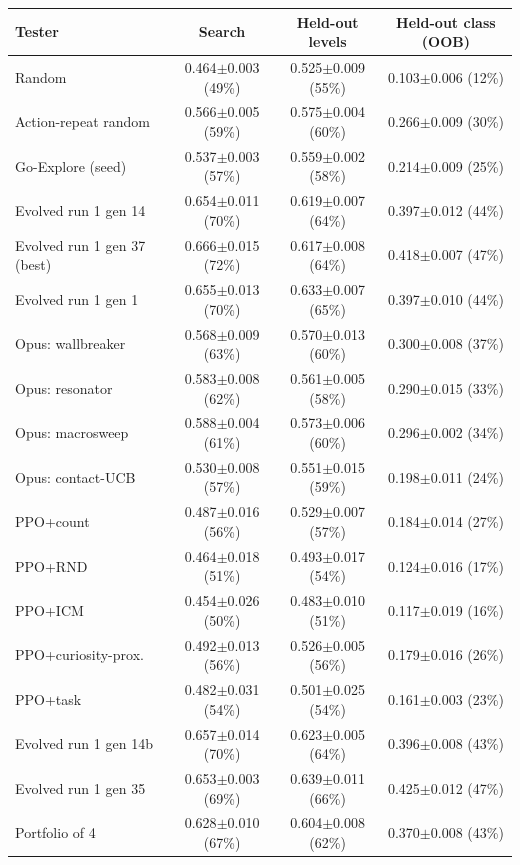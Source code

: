 \begin{table}[t]\centering\small
\begin{tabular}{lccc}
\toprule
Tester & Search & Held-out levels & Held-out class (OOB) \\
\midrule
Random & 0.464$\pm$0.003 (49\%) & 0.525$\pm$0.009 (55\%) & 0.103$\pm$0.006 (12\%) \\
Action-repeat random & 0.566$\pm$0.005 (59\%) & 0.575$\pm$0.004 (60\%) & 0.266$\pm$0.009 (30\%) \\
Go-Explore (seed) & 0.537$\pm$0.003 (57\%) & 0.559$\pm$0.002 (58\%) & 0.214$\pm$0.009 (25\%) \\
Evolved run 1 gen 14 & 0.654$\pm$0.011 (70\%) & 0.619$\pm$0.007 (64\%) & 0.397$\pm$0.012 (44\%) \\
Evolved run 1 gen 37 (best) & 0.666$\pm$0.015 (72\%) & 0.617$\pm$0.008 (64\%) & 0.418$\pm$0.007 (47\%) \\
Evolved run 1 gen 1 & 0.655$\pm$0.013 (70\%) & 0.633$\pm$0.007 (65\%) & 0.397$\pm$0.010 (44\%) \\
Opus: wallbreaker & 0.568$\pm$0.009 (63\%) & 0.570$\pm$0.013 (60\%) & 0.300$\pm$0.008 (37\%) \\
Opus: resonator & 0.583$\pm$0.008 (62\%) & 0.561$\pm$0.005 (58\%) & 0.290$\pm$0.015 (33\%) \\
Opus: macrosweep & 0.588$\pm$0.004 (61\%) & 0.573$\pm$0.006 (60\%) & 0.296$\pm$0.002 (34\%) \\
Opus: contact-UCB & 0.530$\pm$0.008 (57\%) & 0.551$\pm$0.015 (59\%) & 0.198$\pm$0.011 (24\%) \\
PPO+count & 0.487$\pm$0.016 (56\%) & 0.529$\pm$0.007 (57\%) & 0.184$\pm$0.014 (27\%) \\
PPO+RND & 0.464$\pm$0.018 (51\%) & 0.493$\pm$0.017 (54\%) & 0.124$\pm$0.016 (17\%) \\
PPO+ICM & 0.454$\pm$0.026 (50\%) & 0.483$\pm$0.010 (51\%) & 0.117$\pm$0.019 (16\%) \\
PPO+curiosity-prox. & 0.492$\pm$0.013 (56\%) & 0.526$\pm$0.005 (56\%) & 0.179$\pm$0.016 (26\%) \\
PPO+task & 0.482$\pm$0.031 (54\%) & 0.501$\pm$0.025 (54\%) & 0.161$\pm$0.003 (23\%) \\
Evolved run 1 gen 14b & 0.657$\pm$0.014 (70\%) & 0.623$\pm$0.005 (64\%) & 0.396$\pm$0.008 (43\%) \\
Evolved run 1 gen 35 & 0.653$\pm$0.003 (69\%) & 0.639$\pm$0.011 (66\%) & 0.425$\pm$0.012 (47\%) \\
Portfolio of 4 & 0.628$\pm$0.010 (67\%) & 0.604$\pm$0.008 (62\%) & 0.370$\pm$0.008 (43\%) \\

\end{tabular}
\end{table}
